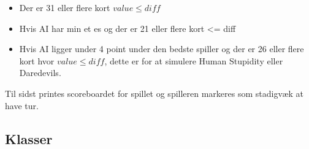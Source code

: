 \documentclass[a4paper]{article}
\begin{document}
\begin{description}
          \begin{itemize}
            \item Der er 31 eller flere kort $value \leq diff$
            \item Hvis AI har min et es og der er 21 eller flere kort <= diff
            \item Hvis AI ligger under 4 point under den bedste spiller og der er 26 eller flere kort hvor $value \leq diff$,
            dette er for at simulere Human Stupidity eller Daredevils.
          \end{itemize}

          Til sidst printes scoreboardet for spillet og spilleren markeres som stadigvæk at have tur.
      \end{description}
      
    \subsection{Klasser} \label{ssec:classes}
\end{document}

